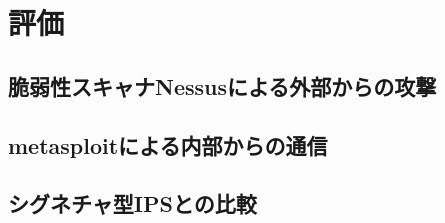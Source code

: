 \chapter{評価}
\section{脆弱性スキャナNessusによる外部からの攻撃}
\section{metasploitによる内部からの通信}
\section{シグネチャ型IPSとの比較}
